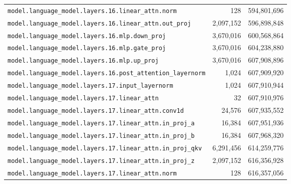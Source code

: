 \documentclass[10pt,a4paper]{article}
\theoremstyle{definition}
\begin{document}
\begin{appendices}
\begin{longtable}{p{9.5cm}rr}
\texttt{model.\allowbreak{}language\_model.\allowbreak{}layers.\allowbreak{}16.\allowbreak{}linear\_attn.\allowbreak{}norm} & 128 & 594,801,696 \\
\texttt{model.\allowbreak{}language\_model.\allowbreak{}layers.\allowbreak{}16.\allowbreak{}linear\_attn.\allowbreak{}out\_proj} & 2,097,152 & 596,898,848 \\
\texttt{model.\allowbreak{}language\_model.\allowbreak{}layers.\allowbreak{}16.\allowbreak{}mlp.\allowbreak{}down\_proj} & 3,670,016 & 600,568,864 \\
\texttt{model.\allowbreak{}language\_model.\allowbreak{}layers.\allowbreak{}16.\allowbreak{}mlp.\allowbreak{}gate\_proj} & 3,670,016 & 604,238,880 \\
\texttt{model.\allowbreak{}language\_model.\allowbreak{}layers.\allowbreak{}16.\allowbreak{}mlp.\allowbreak{}up\_proj} & 3,670,016 & 607,908,896 \\
\texttt{model.\allowbreak{}language\_model.\allowbreak{}layers.\allowbreak{}16.\allowbreak{}post\_attention\_layernorm} & 1,024 & 607,909,920 \\
\texttt{model.\allowbreak{}language\_model.\allowbreak{}layers.\allowbreak{}17.\allowbreak{}input\_layernorm} & 1,024 & 607,910,944 \\
\texttt{model.\allowbreak{}language\_model.\allowbreak{}layers.\allowbreak{}17.\allowbreak{}linear\_attn} & 32 & 607,910,976 \\
\texttt{model.\allowbreak{}language\_model.\allowbreak{}layers.\allowbreak{}17.\allowbreak{}linear\_attn.\allowbreak{}conv1d} & 24,576 & 607,935,552 \\
\texttt{model.\allowbreak{}language\_model.\allowbreak{}layers.\allowbreak{}17.\allowbreak{}linear\_attn.\allowbreak{}in\_proj\_a} & 16,384 & 607,951,936 \\
\texttt{model.\allowbreak{}language\_model.\allowbreak{}layers.\allowbreak{}17.\allowbreak{}linear\_attn.\allowbreak{}in\_proj\_b} & 16,384 & 607,968,320 \\
\texttt{model.\allowbreak{}language\_model.\allowbreak{}layers.\allowbreak{}17.\allowbreak{}linear\_attn.\allowbreak{}in\_proj\_qkv} & 6,291,456 & 614,259,776 \\
\texttt{model.\allowbreak{}language\_model.\allowbreak{}layers.\allowbreak{}17.\allowbreak{}linear\_attn.\allowbreak{}in\_proj\_z} & 2,097,152 & 616,356,928 \\
\texttt{model.\allowbreak{}language\_model.\allowbreak{}layers.\allowbreak{}17.\allowbreak{}linear\_attn.\allowbreak{}norm} & 128 & 616,357,056 \\

\end{longtable}
\end{appendices}
\end{document}
